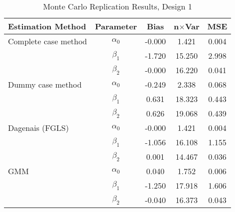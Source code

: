 \begin{table}
\centering
\caption{Monte Carlo Replication Results, Design 1}
\label{table:MCReplicationResultsDesign1}
\begin{tabular}{lcccc}
\toprule
Estimation Method & Parameter & Bias & n$\times$Var & MSE \\
\midrule
Complete case method & $\alpha_0$ & -0.000 & 1.421 & 0.004 \\
 & $\beta_1$ & -1.720 & 15.250 & 2.998 \\
 & $\beta_2$ & -0.000 & 16.220 & 0.041 \\
Dummy case method & $\alpha_0$ & -0.249 & 2.338 & 0.068 \\
 & $\beta_1$ & 0.631 & 18.323 & 0.443 \\
 & $\beta_2$ & 0.626 & 19.068 & 0.439 \\
Dagenais (FGLS) & $\alpha_0$ & -0.000 & 1.421 & 0.004 \\
 & $\beta_1$ & -1.056 & 16.108 & 1.155 \\
 & $\beta_2$ & 0.001 & 14.467 & 0.036 \\
GMM & $\alpha_0$ & 0.040 & 1.752 & 0.006 \\
 & $\beta_1$ & -1.250 & 17.918 & 1.606 \\
 & $\beta_2$ & -0.040 & 16.373 & 0.043 \\
\bottomrule
\end{tabular}
\end{table}
